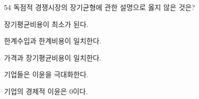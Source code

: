 \begin{question}{54}
독점적 경쟁시장의 장기균형에 관한 설명으로 옳지 않은 것은?
\begin{choices}
  \item 장기평균비용이 최소가 된다.
  \item 한계수입과 한계비용이 일치한다.
  \item 가격과 장기평균비용이 일치한다.
  \item 기업들은 이윤을 극대화한다.
  \item 기업의 경제적 이윤은 0이다.
\end{choices}
\end{question}
